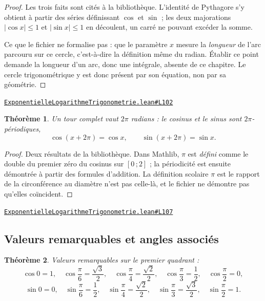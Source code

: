 \documentclass[11pt,a4paper]{article}
\theoremstyle{definition}
\theoremstyle{plain}
\newtheorem{theoreme}{Théorème}
\newcommand{\source}[2]{\par\smallskip\noindent\hfill{\footnotesize\href{#1}{\texttt{#2}}}\par\smallskip}
\begin{document}
\begin{proof}
Les trois faits sont cités à la bibliothèque. L'identité de Pythagore s'y obtient à partir
des séries définissant $\cos$ et $\sin$ ; les deux majorations $|\cos x| \le 1$ et
$|\sin x| \le 1$ en découlent, un carré ne pouvant excéder la somme.

\medskip\noindent
Ce que le fichier ne formalise pas : que le paramètre $x$ mesure la \emph{longueur} de
l'arc parcouru sur ce cercle, c'est-à-dire la définition même du radian. Établir ce point
demande la longueur d'un arc, donc une intégrale, absente de ce chapitre. Le cercle
trigonométrique y est donc présent par son équation, non par sa géométrie.
\end{proof}
\source{https://github.com/Commutator-IO/learn-lean/blob/main/cours/02-lycee/05-exponentielle-logarithme-trigonometrie/ExponentielleLogarithmeTrigonometrie.lean\#L102}{ExponentielleLogarithmeTrigonometrie.lean\#L102}

\begin{theoreme}
Un tour complet vaut $2\pi$ radians : le cosinus et le sinus sont $2\pi$-périodiques,
\[ \cos(x + 2\pi) = \cos x, \qquad \sin(x + 2\pi) = \sin x . \]
\end{theoreme}

\begin{proof}
Deux résultats de la bibliothèque. Dans Mathlib, $\pi$ est \emph{défini} comme le double du
premier zéro du cosinus sur $[0\,;2]$ ; la périodicité est ensuite démontrée à partir des
formules d'addition. La définition scolaire \textemdash{} $\pi$ est le rapport de la
circonférence au diamètre \textemdash{} n'est pas celle-là, et le fichier ne démontre pas
qu'elles coïncident.
\end{proof}
\source{https://github.com/Commutator-IO/learn-lean/blob/main/cours/02-lycee/05-exponentielle-logarithme-trigonometrie/ExponentielleLogarithmeTrigonometrie.lean\#L107}{ExponentielleLogarithmeTrigonometrie.lean\#L107}

\subsection{Valeurs remarquables et angles associés}

\begin{theoreme}
Valeurs remarquables sur le premier quadrant :
\[ \cos 0 = 1, \quad \cos\frac{\pi}{6} = \frac{\sqrt{3}}{2}, \quad
   \cos\frac{\pi}{4} = \frac{\sqrt{2}}{2}, \quad \cos\frac{\pi}{3} = \frac{1}{2}, \quad
   \cos\frac{\pi}{2} = 0, \]
\[ \sin 0 = 0, \quad \sin\frac{\pi}{6} = \frac{1}{2}, \quad
   \sin\frac{\pi}{4} = \frac{\sqrt{2}}{2}, \quad \sin\frac{\pi}{3} = \frac{\sqrt{3}}{2},
   \quad \sin\frac{\pi}{2} = 1 . \]
\end{theoreme}
\end{document}
